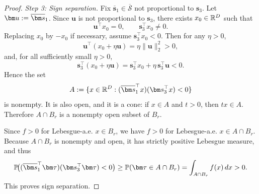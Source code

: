 \begin{proof}
  \emph{Step 3: Sign separation.}
  Fix $\overline{\bm s}_1\in\overline{\mathcal{S}}$ not proportional to $\bm s_3$.
  Let $\bm u\defeq \overline{\bm s}_1$.
  Since $\bm u$ is not proportional to $\bm s_3$, there exists $x_0\in\mathbb{R}^D$ such that
  \[
    \bm u^\top x_0 = 0,
    \qquad
    \bm s_3^\top x_0\neq 0.
  \]
  Replacing $x_0$ by $-x_0$ if necessary, assume $\bm s_3^\top x_0<0$.
  Then for any $\eta>0$,
  \[
    \bm u^\top(x_0+\eta \bm u)=\eta\|\bm u\|_2^2>0,
  \]
  and, for all sufficiently small $\eta>0$,
  \[
    \bm s_3^\top(x_0+\eta \bm u)
    =
    \bm s_3^\top x_0+\eta\,\bm s_3^\top \bm u
    <0.
  \]
  Hence the set
  \[
    A
    \defeq
    \{x\in\R^D:(\overline{\bm s}_1^\top x)(\bm s_3^\top x)<0\}
  \]
  is nonempty.
  It is also open, and it is a cone: if $x\in A$ and $t>0$, then $tx\in A$.
  Therefore $A\cap B_r$ is a nonempty open subset of $B_r$.

  Since $f>0$ for Lebesgue-a.e. $x\in B_r$, we have $f>0$ for Lebesgue-a.e. $x\in A\cap B_r$.
  Because $A\cap B_r$ is nonempty and open, it has strictly positive Lebesgue measure, and thus
  \[
    \P\!\bigl((\overline{\bm s}_1^\top\bm\tau)(\bm s_3^\top\bm\tau)<0\bigr)
    \ge
    \P(\bm\tau\in A\cap B_r)
    =
    \int_{A\cap B_r} f(x)\,dx
    >
    0.
  \]
  This proves sign separation.
\end{proof}

